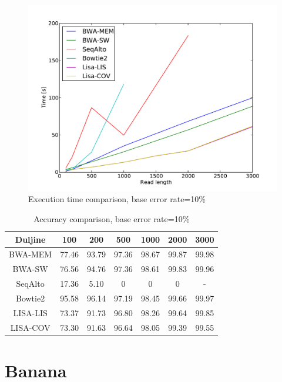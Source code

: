 \documentclass[times, utf8, diplomski]{fer}
\begin{document}
\begin{figure}[H]
\centering
\includegraphics[width=1.0\textwidth]{../img/yersinia-e10-time.pdf}
\caption{Execution time comparison, base error rate=10\%}\label{yersinia-e10-time}
\end{figure}

\begin{table}[H]
\centering
\begin{tabular}{|c||c|c|c|c|c|c|}
\hline
	Duljine & 100 & 200 & 500 & 1000 & 2000 & 3000\\
\hline
\hline
	BWA-MEM & 77.46 & 93.79 & 97.36 & 98.67 & 99.87 & 99.98\\
\hline
	BWA-SW  & 76.56 & 94.76 & 97.36 & 98.61 & 99.83 & 99.96\\
\hline
	SeqAlto & 17.36 & 5.10 & 0 & 0 & 0 & -\\
\hline
	Bowtie2    & 95.58 & 96.14 & 97.19 & 98.45 & 99.66 & 99.97\\
\hline
	LISA-LIS   & 73.37 & 91.73 & 96.80 & 98.26 & 99.64 & 99.85\\
\hline
	LISA-COV  & 73.30 & 91.63 & 96.64 & 98.05 & 99.39 & 99.55\\
\hline
\end{tabular}
\caption{Accuracy comparison, base error rate=10\%}\label{yersinia-e10-correct}
\end{table}


\section{Banana}
\end{document}
